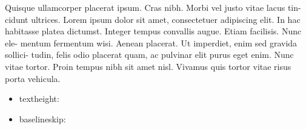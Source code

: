 \documentclass[draft,12pt,twoside,a4paper]{book}
\begin{document}
Quisque ullamcorper placerat ipsum. Cras nibh. Morbi vel justo vitae lacus tin- cidunt ultrices. Lorem ipsum dolor sit amet, consectetuer adipiscing elit. In hac habitasse platea dictumst. Integer tempus convallis augue. Etiam facilisis. Nunc ele- mentum fermentum wisi. Aenean placerat. Ut imperdiet, enim sed gravida sollici- tudin, felis odio placerat quam, ac pulvinar elit purus eget enim. Nunc vitae tortor. Proin tempus nibh sit amet nisl. Vivamus quis tortor vitae risus porta vehicula.
  
\begin{itemize}
\item textheight: \the\textheight
\item baselineskip: \the\baselineskip
\end{itemize}

\end{document}
